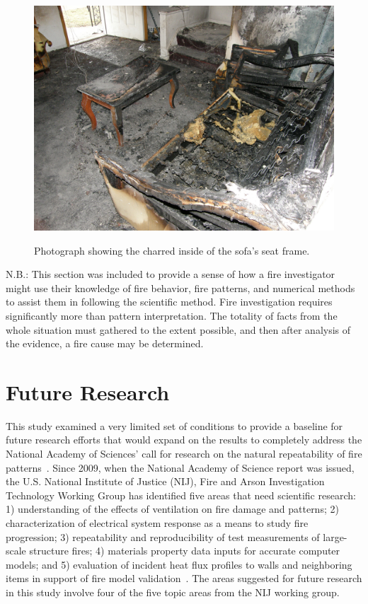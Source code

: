 \documentclass[twoside]{uocthesis}
\begin{document}
{\begin{figure}[h]
	\includegraphics[width=5in]{../Figures/Table} \\
	\caption[Photograph showing the charred inside of the sofa's seat frame.]{Photograph showing the charred inside of the sofa's seat frame.}
	\label{Table}
\end{figure}

N.B.: This section was included to provide a sense of how a fire investigator might use their knowledge of fire behavior, fire patterns, and numerical methods to assist them in following the scientific method.  Fire investigation requires significantly more than pattern interpretation.  The totality of facts from the whole situation must gathered to the extent possible, and then after analysis of the evidence, a fire cause may be determined. 

\chapter{Future Research}

This study examined a very limited set of conditions to provide a baseline for future research efforts that would expand on the results to completely address the National Academy of Sciences' call for research on the natural repeatability of fire patterns~\cite{Forensic:2009}.   Since 2009, when the National Academy of Science report was issued, the U.S. National Institute of Justice (NIJ), Fire and Arson Investigation Technology Working Group has identified five areas that need scientific research: 1) understanding of the effects of ventilation on fire damage and patterns; 2) characterization of electrical system response as a means to study fire progression; 3) repeatability and reproducibility of test measurements of large-scale structure fires; 4) materials property data inputs for accurate computer models; and 5) evaluation of incident heat flux profiles to walls and neighboring items in support of fire model validation~\cite{NIJ:2016}.  The areas suggested for future research in this study involve four of the five topic areas from the NIJ working group.   

}
\end{document}
